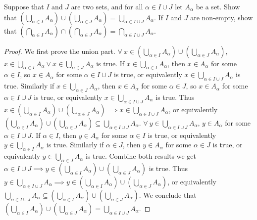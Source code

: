 \begin{exercise}\label{ex 3.4.10}
Suppose that \(I\) and \(J\) are two sets, and for all \(\alpha \in I \cup J\) let \(A_{\alpha}\) be a set.
Show that \((\bigcup_{\alpha \in I} A_{\alpha}) \cup (\bigcup_{\alpha \in J} A_{\alpha}) = \bigcup_{\alpha \in I \cup J} A_{\alpha}\).
If \(I\) and \(J\) are non-empty, show that \((\bigcap_{\alpha \in I} A_{\alpha}) \cap (\bigcap_{\alpha \in J} A_{\alpha}) = \bigcap_{\alpha \in I \cup J} A_{\alpha}\).
\end{exercise}

\begin{proof}
We first prove the union part.
\(\forall\ x \in (\bigcup_{\alpha \in I} A_{\alpha}) \cup (\bigcup_{\alpha \in J} A_{\alpha})\), \(x \in \bigcup_{\alpha \in I} A_{\alpha} \lor x \in \bigcup_{\alpha \in J} A_{\alpha}\) is true.
If \(x \in \bigcup_{\alpha \in I} A_{\alpha}\), then \(x \in A_{\alpha}\) for some \(\alpha \in I\), so \(x \in A_{\alpha}\) for some \(\alpha \in I \cup J\) is true, or equivalently \(x \in \bigcup_{\alpha \in I \cup J} A_{\alpha}\) is true.
Similarly if \(x \in \bigcup_{\alpha \in J} A_{\alpha}\), then \(x \in A_{\alpha}\) for some \(\alpha \in J\), so \(x \in A_{\alpha}\) for some \(\alpha \in I \cup J\) is true, or equivalently \(x \in \bigcup_{\alpha \in I \cup J} A_{\alpha}\) is true.
Thus \(x \in (\bigcup_{\alpha \in I} A_{\alpha}) \cup (\bigcup_{\alpha \in J} A_{\alpha}) \implies x \in \bigcup_{\alpha \in I \cup J} A_{\alpha}\), or equivalently \((\bigcup_{\alpha \in I} A_{\alpha}) \cup (\bigcup_{\alpha \in J} A_{\alpha}) \subseteq \bigcup_{\alpha \in I \cup J} A_{\alpha}\).
\(\forall\ y \in \bigcup_{\alpha \in I \cup J} A_{\alpha}\), \(y \in A_{\alpha}\) for some \(\alpha \in I \cup J\).
If \(\alpha \in I\), then \(y \in A_{\alpha}\) for some \(\alpha \in I\) is true, or equivalently \(y \in \bigcup_{\alpha \in I} A_{\alpha}\) is true.
Similarly if \(\alpha \in J\), then \(y \in A_{\alpha}\) for some \(\alpha \in J\) is true, or equivalently \(y \in \bigcup_{\alpha \in J} A_{\alpha}\) is true.
Combine both results we get \(\alpha \in I \cup J \implies y \in (\bigcup_{\alpha \in I} A_{\alpha}) \cup (\bigcup_{\alpha \in J} A_{\alpha})\) is true.
Thus \(y \in \bigcup_{\alpha \in I \cup J} A_{\alpha} \implies y \in (\bigcup_{\alpha \in I} A_{\alpha}) \cup (\bigcup_{\alpha \in J} A_{\alpha})\), or equivalently \(\bigcup_{\alpha \in I \cup J} A_{\alpha} \subseteq (\bigcup_{\alpha \in I} A_{\alpha}) \cup (\bigcup_{\alpha \in J} A_{\alpha})\).
We conclude that \((\bigcup_{\alpha \in I} A_{\alpha}) \cup (\bigcup_{\alpha \in J} A_{\alpha}) = \bigcup_{\alpha \in I \cup J} A_{\alpha}\).


\end{proof}
